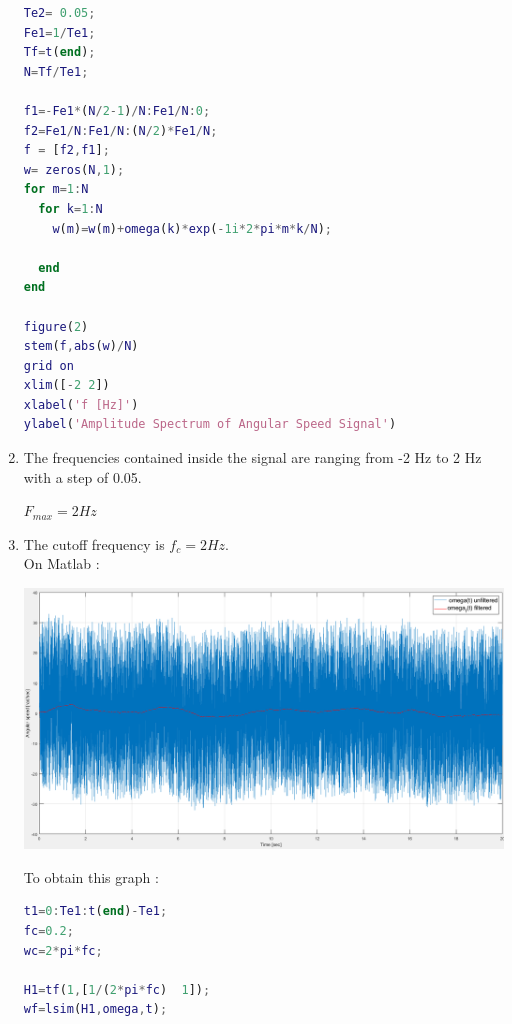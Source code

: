 \documentclass[a4paper,12pt]{article}
\begin{document}
\begin{enumerate}[label={\color{blue}\arabic*)}]
\begin{multicols}{2}
    \begin{lstlisting}[style=Matlab-editor,language=Matlab, basicstyle=\small\ttfamily]
% Plot of the DFT of omega(t)
Te2= 0.05;
Fe1=1/Te1;
Tf=t(end);
N=Tf/Te1;

f1=-Fe1*(N/2-1)/N:Fe1/N:0;
f2=Fe1/N:Fe1/N:(N/2)*Fe1/N;
f = [f2,f1];
w= zeros(N,1);
for m=1:N
  for k=1:N
    w(m)=w(m)+omega(k)*exp(-1i*2*pi*m*k/N);

  end
end

figure(2)
stem(f,abs(w)/N)
grid on
xlim([-2 2])
xlabel('f [Hz]')
ylabel('Amplitude Spectrum of Angular Speed Signal')
        \end{lstlisting}

    \end{multicols}

    \item
    The frequencies contained inside the signal are ranging from -2 Hz to 2 Hz with a step of 0.05.

    \(F_{max} = 2 Hz\)
    \newpage

    \item
    The cutoff frequency is \(f_c = 2 Hz\). \\
    On Matlab :

    \begin{center}
        \includegraphics[scale=0.35]{Images/Omega_Filtered.png}
        \label{Figure3}
    \end{center}

    To obtain this graph :

    \begin{lstlisting}[style=Matlab-editor,language=Matlab, basicstyle=\small\ttfamily]
% filter design
t1=0:Te1:t(end)-Te1;
fc=0.2;
wc=2*pi*fc;

H1=tf(1,[1/(2*pi*fc)  1]);
wf=lsim(H1,omega,t);


\end{lstlisting}
\end{enumerate}
\end{document}
